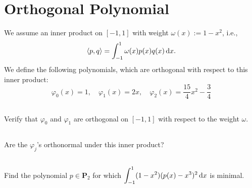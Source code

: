 \documentclass[11pt,letterpaper]{article}
\begin{document}
\section{Orthogonal Polynomial}
We assume
  an inner product on $[-1,1]$ with weight $\omega(x):=1-x^2$, i.e.,
  $$
  \langle p,q\rangle = \int_{-1}^1 \omega(x)p(x)q(x)\,\mathrm{d} x.
  $$ We define the following polynomials, which are orthogonal with
  respect to this inner product:
  $$
  \varphi_0(x) = 1, \quad \varphi_1(x) = 2x, \quad \varphi_2(x) = \frac{15}{4}x^2-\frac 34
  $$

\subsection{}
Verify that $\varphi_0$ and $\varphi_1$ are orthogonal on $[-1,1]$
    with respect to the weight $\omega$.

\subsection{}
Are the $\varphi_j$'s orthonormal under this inner product?

\subsection{}
Find the polynomial $p \in \boldsymbol P_2$ for which
    $\displaystyle \int_{-1}^1 (1-x^2)(p(x) - x^3)^2 \, \mathrm{d} x$ is minimal.




% 
% 
\end{document}
